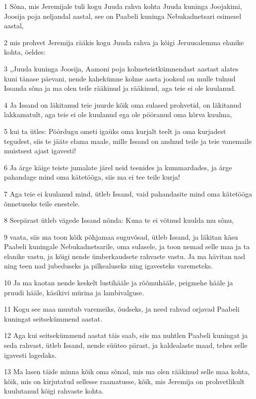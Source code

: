 \par 1 Sõna, mis Jeremijale tuli kogu Juuda rahva kohta Juuda kuninga Joojakimi, Joosija poja neljandal aastal, see on Paabeli kuninga Nebukadnetsari esimesel aastal,
\par 2 mis prohvet Jeremija rääkis kogu Juuda rahva ja kõigi Jeruusalemma elanike kohta, öeldes:
\par 3 „Juuda kuninga Joosija, Aamoni poja kolmeteistkümnendast aastast alates kuni tänase päevani, nende kahekümne kolme aasta jooksul on mulle tulnud Issanda sõna ja ma olen teile rääkinud ja rääkinud, aga teie ei ole kuulanud.
\par 4 Ja Issand on läkitanud teie juurde kõik oma sulased prohvetid, on läkitanud lakkamatult, aga teie ei ole kuulanud ega ole pööranud oma kõrva kuulma,
\par 5 kui ta ütles: Pöördugu ometi igaüks oma kurjalt teelt ja oma kurjadest tegudest, siis te jääte elama maale, mille Issand on andnud teile ja teie vanemaile muistsest ajast igavesti!
\par 6 Ja ärge käige teiste jumalate järel neid teenides ja kummardades, ja ärge pahandage mind oma kätetööga, siis ma ei tee teile kurja!
\par 7 Aga teie ei kuulanud mind, ütleb Issand, vaid pahandasite mind oma kätetööga õnnetuseks teile enestele.
\par 8 Seepärast ütleb vägede Issand nõnda: Kuna te ei võtnud kuulda mu sõnu,
\par 9 vaata, siis ma toon kõik põhjamaa suguvõsad, ütleb Issand, ja läkitan käsu Paabeli kuningale Nebukadnetsarile, oma sulasele, ja toon nemad selle maa ja ta elanike vastu, ja kõigi nende ümberkaudsete rahvaste vastu. Ja ma hävitan nad ning teen nad jubeduseks ja pilkealuseks ning igavesteks varemeteks.
\par 10 Ja ma kaotan nende keskelt lustihääle ja rõõmuhääle, peigmehe hääle ja pruudi hääle, käsikivi mürina ja lambivalguse.
\par 11 Kogu see maa muutub varemeiks, õudseks, ja need rahvad orjavad Paabeli kuningat seitsekümmend aastat.
\par 12 Aga kui seitsekümmend aastat täis saab, siis ma nuhtlen Paabeli kuningat ja seda rahvast, ütleb Issand, nende süüteo pärast, ja kaldealaste maad, tehes selle igavesti lagedaks.
\par 13 Ma lasen täide minna kõik oma sõnad, mis ma olen rääkinud selle maa kohta, kõik, mis on kirjutatud sellesse raamatusse, kõik, mis Jeremija on prohvetlikult kuulutanud kõigi rahvaste kohta.
